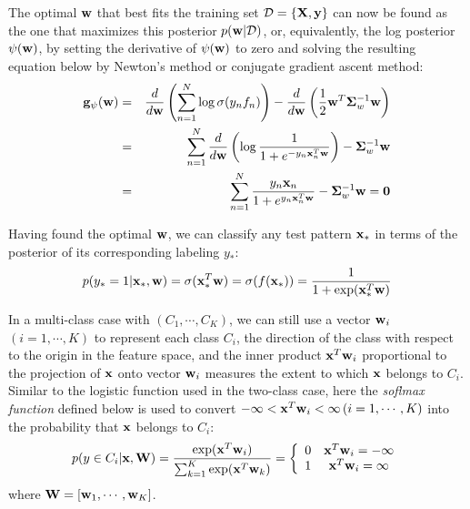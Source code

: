 \documentclass{article}
\begin{document}
The optimal ${\bf w}$ that best fits the training set
${\cal D}=\{{\bf X},{\bf y}\}$ can now be found as the one that 
maximizes this posterior $p({\bf w}|{\cal D})$, or, equivalently, 
the log posterior $\psi({\bf w})$, by setting the derivative of 
$\psi({\bf w})$ to zero and solving the resulting equation below
by Newton's method or conjugate gradient ascent method:
\begin{eqnarray}
  {\bf g}_{\psi}({\bf w})
  &=&\frac{d}{d{\bf w}} \left(\sum_{n=1}^N\log \sigma(y_nf_n) \right)
  -\frac{d}{d{\bf w}}\left(\frac{1}{2}{\bf w}^T{\bf\Sigma}_w^{-1}{\bf w}\right)
  \nonumber\\
  &=&\sum_{n=1}^N\frac{d}{d{\bf w}} 
  \left(\log \frac{1}{1+e^{-y_n{\bf x}_n^T{\bf w}}}\right)
  -{\bf\Sigma}_w^{-1}{\bf w}
  \nonumber\\
  &=&\sum_{n=1}^N\frac{y_n{\bf x}_n }{1+e^{y_n{\bf x}_n^T{\bf w}}}
  -{\bf\Sigma}_w^{-1}{\bf w} ={\bf 0}
\end{eqnarray}

Having found the optimal ${\bf w}$, we can classify any test pattern 
${\bf x}_*$ in terms of the posterior of its corresponding labeling $y_*$:
\begin{equation}
  p(y_*=1|{\bf x}_*,{\bf w})=\sigma({\bf x}_*^T{\bf w})
  =\sigma(f({\bf x}_*))=\frac{1}{1+\exp({\bf x}_*^T{\bf w})}
\end{equation}

In a multi-class case with $(C_1,\cdots,C_K)$, we can still use a vector
${\bf w}_i$ $(i=1,\cdots,K)$ to represent each class $C_i$, the direction 
of the class with respect to the origin in the feature space, and the inner 
product ${\bf x}^T{\bf w}_i$ proportional to the projection of ${\bf x}$
onto vector ${\bf w}_i$ measures the extent to which ${\bf x}$ belongs to
$C_i$. Similar to the logistic function used in the two-class case, here 
the {\em soflmax function} defined below is used to convert 
$-\infty<{\bf x}^T{\bf w}_i<\infty\,(i=1,\cdots,K)$ into the probability 
that ${\bf x}$ belongs to $C_i$:
\begin{equation}
  p(y\in C_i|{\bf x},{\bf W})
  =\frac{\exp({\bf x}^T{\bf w}_i)}{\sum_{k=1}^K\exp({\bf x}^T{\bf w}_k)}
  =\left\{\begin{array}{cc}
  0 & {\bf x}^T{\bf w}_i=-\infty\\1 & {\bf x}^T{\bf w}_i=\infty\end{array}\right.
\end{equation}
where ${\bf W}=[{\bf w}_1,\cdots,{\bf w}_K]$.
\end{document}
